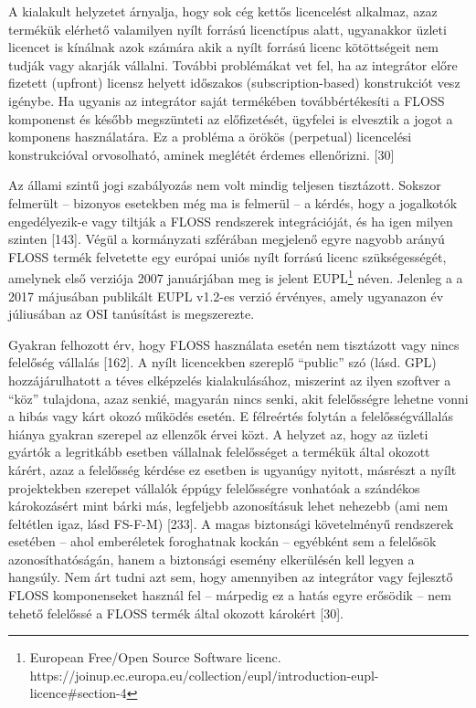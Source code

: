 \documentclass[12pt,magyar,a4paper,oneside]{scrreprt}
\begin{document}
A kialakult helyzetet árnyalja, hogy sok cég kettős licencelést
alkalmaz, azaz termékük elérhető valamilyen nyílt forrású licenctípus
alatt, ugyanakkor üzleti licencet is kínálnak azok számára akik a nyílt
forrású licenc kötöttségeit nem tudják vagy akarják vállalni. További
problémákat vet fel, ha az integrátor előre fizetett (upfront) licensz
helyett időszakos (subscription-based) konstrukciót vesz igénybe. Ha
ugyanis az integrátor saját termékében továbbértékesíti a FLOSS
komponenst és később megszünteti az előfizetését, ügyfelei is elvesztik
a jogot a komponens használatára. Ez a probléma a örökös (perpetual)
licencelési konstrukcióval orvosolható, aminek meglétét érdemes
ellenőrizni. {[}30{]}

Az állami szintű jogi szabályozás nem volt mindig teljesen tisztázott.
Sokszor felmerült -- bizonyos esetekben még ma is felmerül -- a kérdés,
hogy a jogalkotók engedélyezik-e vagy tiltják a FLOSS rendszerek
integrációját, és ha igen milyen szinten {[}143{]}. Végül a kormányzati
szférában megjelenő egyre nagyobb arányú FLOSS termék felvetette egy
európai uniós nyílt forrású licenc szükségességét, amelynek első
verziója 2007 januárjában meg is jelent EUPL\footnote{European Free/Open
  Source Software licenc.
  https://joinup.ec.europa.eu/collection/eupl/introduction-eupl-licence\#section-4}
néven. Jelenleg a a 2017 májusában publikált EUPL v1.2-es verzió
érvényes, amely ugyanazon év júliusában az OSI tanúsítást is
megszerezte.

Gyakran felhozott érv, hogy FLOSS használata esetén nem tisztázott vagy
nincs felelőség vállalás {[}162{]}. A nyílt licencekben szereplő
``public'' szó (lásd. GPL) hozzájárulhatott a téves elképzelés
kialakulásához, miszerint az ilyen szoftver a ``köz'' tulajdona, azaz
senkié, magyarán nincs senki, akit felelősségre lehetne vonni a hibás
vagy kárt okozó működés esetén. E félreértés folytán a
felelősségvállalás hiánya gyakran szerepel az ellenzők érvei közt. A
helyzet az, hogy az üzleti gyártók a legritkább esetben vállalnak
felelősséget a termékük által okozott kárért, azaz a felelősség kérdése
ez esetben is ugyanúgy nyitott, másrészt a nyílt projektekben szerepet
vállalók éppúgy felelősségre vonhatóak a szándékos károkozásért mint
bárki más, legfeljebb azonosításuk lehet nehezebb (ami nem feltétlen
igaz, lásd FS-F-M) {[}233{]}. A magas biztonsági követelményű rendszerek
esetében -- ahol emberéletek foroghatnak kockán -- egyébként sem a
felelősök azonosíthatóságán, hanem a biztonsági esemény elkerülésén kell
legyen a hangsúly. Nem árt tudni azt sem, hogy amennyiben az integrátor
vagy fejlesztő FLOSS komponenseket használ fel -- márpedig ez a hatás
egyre erősödik -- nem tehető felelőssé a FLOSS termék által okozott
károkért {[}30{]}.
\end{document}
